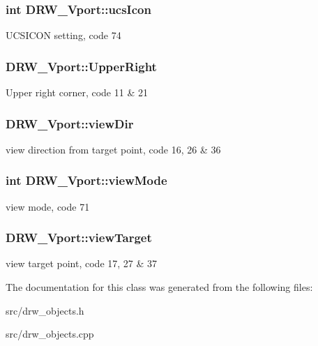 \subsubsection[{ucs\+Icon}]{\setlength{\rightskip}{0pt plus 5cm}int D\+R\+W\+\_\+\+Vport\+::ucs\+Icon}\label{class_d_r_w___vport_ac3bd19802da31bd4bb9e07255e0bbdc6}
U\+C\+S\+I\+C\+O\+N setting, code 74 \hypertarget{class_d_r_w___vport_ae63541133c20a69a6e13f25191e02b05}{}
\subsubsection[{Upper\+Right}]{ D\+R\+W\+\_\+\+Vport\+::\+Upper\+Right}\label{class_d_r_w___vport_ae63541133c20a69a6e13f25191e02b05}
Upper right corner, code 11 \& 21 \hypertarget{class_d_r_w___vport_a657f3b92d041527a5a485dce22c448a1}{}
\subsubsection[{view\+Dir}]{ D\+R\+W\+\_\+\+Vport\+::view\+Dir}\label{class_d_r_w___vport_a657f3b92d041527a5a485dce22c448a1}
view direction from target point, code 16, 26 \& 36 \hypertarget{class_d_r_w___vport_ab96feaf67d7eed371e30ffdf04a4a9cb}{}
\subsubsection[{view\+Mode}]{\setlength{\rightskip}{0pt plus 5cm}int D\+R\+W\+\_\+\+Vport\+::view\+Mode}\label{class_d_r_w___vport_ab96feaf67d7eed371e30ffdf04a4a9cb}
view mode, code 71 \hypertarget{class_d_r_w___vport_a93eb77539e5ad11990b828074685d85f}{}
\subsubsection[{view\+Target}]{ D\+R\+W\+\_\+\+Vport\+::view\+Target}\label{class_d_r_w___vport_a93eb77539e5ad11990b828074685d85f}
view target point, code 17, 27 \& 37 

The documentation for this class was generated from the following files\+:\begin{DoxyCompactItemize}
\item 
src/drw\+\_\+objects.\+h\item 
src/drw\+\_\+objects.\+cpp\end{DoxyCompactItemize}
